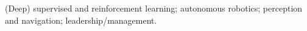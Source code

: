 (Deep) supervised and reinforcement learning; autonomous robotics; perception and navigation; leadership/management.